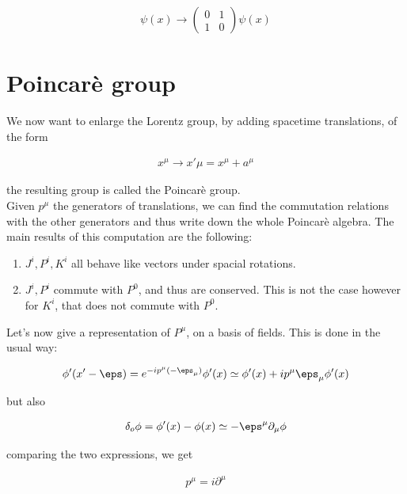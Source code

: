 \documentclass{report}
\begin{document}
\begin{align}
    \psi(x) \rightarrow \begin{pmatrix}
        0 & 1 \\
        1 & 0 
    \end{pmatrix}
    \psi(x)
\end{align}

\section{Poincarè group}

We now want to enlarge the Lorentz group, by adding spacetime translations, of the form 

\begin{align}
    x^\mu \rightarrow x'\mu = x^{\mu} + a^{\mu}
\end{align}

the resulting group is called the Poincarè group. \\

Given \(p^\mu\) the generators of translations, we can find the commutation relations with the other generators and thus write down the whole Poincarè algebra. The main results of this computation are the following: 

\begin{enumerate}
    \item \(J^i, P^i, K^i\) all behave like vectors under spacial rotations. 
    \item \(J^i, P^i\) commute with \(P^0\), and thus are conserved. This is not the case however for \(K^i\), that does not commute with \(P^0\). 
\end{enumerate}

Let's now give a representation of \(P^\mu\), on a basis of fields. This is done in the usual way: 

\begin{align}
    \phi' (x' -\eps) = e^{-ip^\mu (-\eps_\mu)}\phi'(x) \simeq \phi'(x) + ip^\mu \eps_\mu \phi'(x)
\end{align}

but also 

\begin{align}
    \delta_o \phi = \phi'(x) - \phi(x) \simeq -\eps^\mu \partial_\mu \phi
\end{align}

comparing the two expressions, we get 

\begin{align}
    p^\mu = i\partial^\mu
\end{align}
\end{document}
